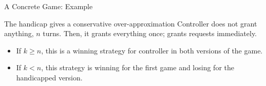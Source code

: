 \documentclass[aspectratio=169]{beamer}
\begin{document}
\begin{frame}{A Concrete Game: Example}
  \begin{center}
  \end{center}
  \begin{block}{The handicap gives a conservative over-approximation}
    Controller does not grant anything, $n$ turns. Then, it grants
    everything once; grants requests immediately.
    \begin{itemize}
      \item If $k \geq n$, this is a \alert{winning strategy} for controller
        in both versions of the game.
      \item If $k < n$, this strategy is winning for the first game and
        \alert{losing for the handicapped version}.
    \end{itemize}
  \end{block}
\end{frame}
\end{document}
